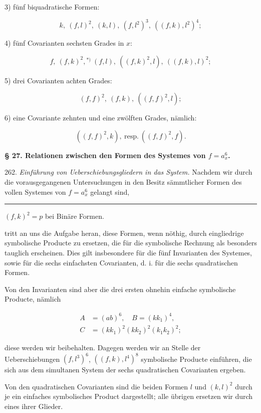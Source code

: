 3) fünf biquadratische Formen:

\[
k, \ (f, l)^2, \ (k, l), \ (f, l^2)^3, \ ((f, k), l^2)^4;
\]

4) fünf Covarianten sechsten Grades in $x$:

\[
f, \ (f, k)^2, {}^{*)} \ (f, l), \ ((f, k)^2, l), \ ((f, k), l)^2;
\]

5) drei Covarianten achten Grades:

\[
(f, f)^2, \ (f, k), \ ((f, f)^2, l);
\]

6) eine Covariante zehnten und eine zwölften Grades, nämlich:

\[
((f, f)^2, k), \ \text{resp.} \ ((f, f)^2, f).
\]

\bigskip
\noindent\textbf{§ 27. Relationen zwischen den Formen des Systemes von $f = a_x^6$.}
\bigskip

262. \textit{Einführung von Ueberschiebungsgliedern in das System.} Nachdem
 wir durch die vorausgegangenen Untersuchungen in den Besitz
sämmtlicher Formen des vollen Systemes von $f = a_x^6$ gelangt sind,

\bigskip
\noindent\rule{4cm}{0.4pt}

\noindent{*)} $(f, k)^2 = p$ bei  \glqq Binäre Formen\grqq.


tritt an uns die Aufgabe heran, diese Formen, wenn nöthig, durch
eingliedrige symbolische Producte zu ersetzen, die für die symbolische
Rechnung als besonders tauglich erscheinen. Dies gilt insbesondere
für die fünf Invarianten des Systemes, sowie für die sechs einfachsten
Covarianten, d. i. für die sechs quadratischen Formen.

Von den Invarianten sind aber die drei ersten ohnehin einfache
symbolische Producte, nämlich

\[
\begin{aligned}
A &= (ab)^6, \quad B = (kk_1)^4,\\
C &= (kk_1)^2 (kk_2)^2 (k_1k_2)^2;
\end{aligned}
\]

diese werden wir beibehalten. Dagegen werden wir an Stelle der
Ueberschiebungen $(f, l^3)^6$, $((f, k), l^4)^8$ symbolische Producte einführen,
die sich aus dem simultanen System der sechs quadratischen Covarianten
 ergeben.

Von den quadratischen Covarianten sind die beiden Formen $l$
und $(k, l)^2$ durch je ein einfaches symbolisches Product dargestellt;
alle übrigen ersetzen wir durch eines ihrer Glieder.

